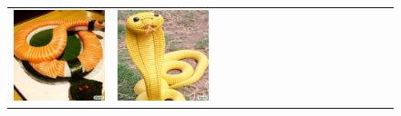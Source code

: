 \begin{figure}[ht!]
\begin{adjustwidth}{-0.8in}{-0.5in}
\begin{tabular}{cccccccccccccccccccc}
\multicolumn{3}{c}{\includegraphics[width=\twobytwocolwidth\textwidth]{figures/cherries/snake_sushi.jpg}} &
\multicolumn{3}{c}{\includegraphics[width=\twobytwocolwidth\textwidth]{figures/cherries/snake_corn.jpg}} &&

\end{tabular}
\end{adjustwidth}
\end{figure}
